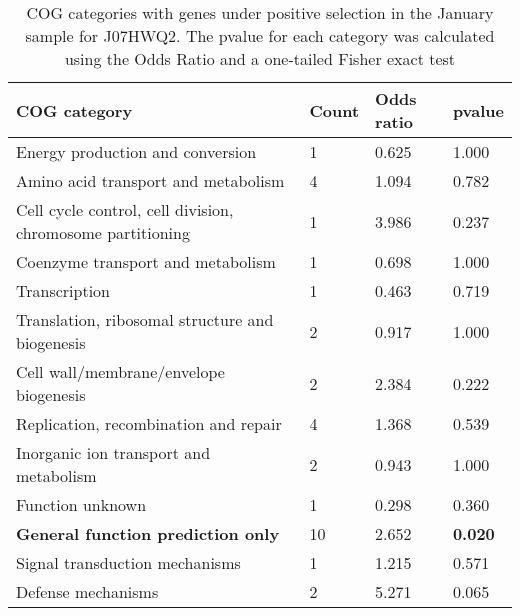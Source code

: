\begin{table}[]
\footnotesize 
	\tabcolsep=0.11cm 
\caption{COG categories with genes under positive selection in the January sample for J07HWQ2. The pvalue for each category was calculated using the Odds Ratio and a one-tailed Fisher exact test \\} 
\begin{tabularx}{\textwidth}{L{6cm}R{2cm}R{2cm}R{2cm}} 
\hline 
\textbf{COG category} & \textbf{Count} & \textbf{Odds ratio} & \textbf{pvalue} \\ 
\hline 
Energy production and conversion & 1 & 0.625 & 1.000 \\ 
Amino acid transport and metabolism & 4 & 1.094 & 0.782 \\ 
Cell cycle control, cell division, chromosome partitioning & 1 & 3.986 & 0.237 \\ 
Coenzyme transport and metabolism & 1 & 0.698 & 1.000 \\ 
Transcription & 1 & 0.463 & 0.719 \\ 
Translation, ribosomal structure and biogenesis & 2 & 0.917 & 1.000 \\ 
Cell wall/membrane/envelope biogenesis & 2 & 2.384 & 0.222 \\ 
Replication, recombination and repair & 4 & 1.368 & 0.539 \\ 
Inorganic ion transport and metabolism & 2 & 0.943 & 1.000 \\ 
Function unknown & 1 & 0.298 & 0.360 \\ 
\textbf{General function prediction only} & 10 & 2.652 & \textbf{0.020} \\ 
Signal transduction mechanisms & 1 & 1.215 & 0.571 \\ 
Defense mechanisms & 2 & 5.271 & 0.065 \\ 
\end{tabularx} 
\label{January_COG_Selection_J07HWQ2} 
 \end{table} 


